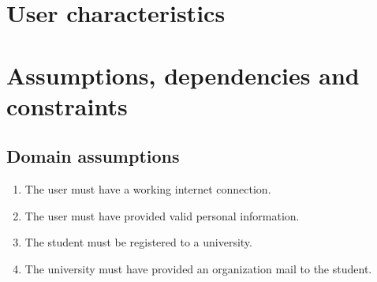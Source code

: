 \section{User characteristics}

\section{Assumptions, dependencies and constraints}

\subsection{Domain assumptions}

\begin{enumerate}[label=\textbf{D\arabic* -}]
    \item The user must have a working internet connection.
    \item The user must have provided valid personal information.
    \item The student must be registered to a university.
    \item The university must have provided an organization mail to the student.
\end{enumerate}
